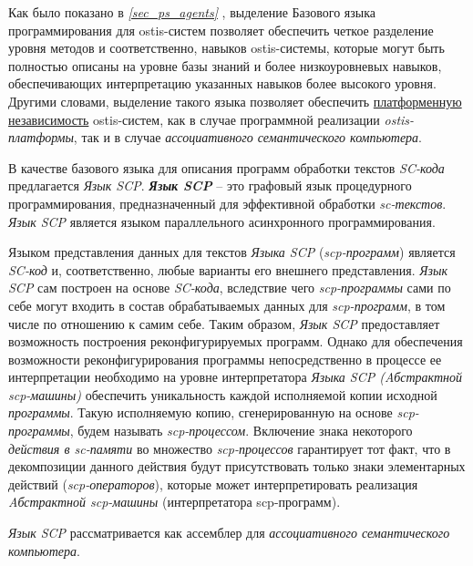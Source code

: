 Как было показано в \textit{\ref{sec_ps_agents} }, выделение Базового языка программирования для ostis-систем позволяет обеспечить четкое разделение уровня методов и соответственно, навыков ostis-системы, которые могут быть полностью описаны на уровне базы знаний и более низкоуровневых навыков, обеспечивающих интерпретацию указанных навыков более высокого уровня. Другими словами, выделение такого языка позволяет обеспечить \uline{платформенную независимость} ostis-систем, как в случае программной реализации \textit{ostis-платформы}, так и в случае \textit{ассоциативного семантического компьютера}.

В качестве базового языка для описания программ обработки текстов \textit{SC-кода} предлагается \textit{Язык SCP}. \textbf{\textit{Язык SCP}} -- это графовый язык процедурного программирования, предназначенный для эффективной обработки \textit{sc-текстов}. \textit{Язык SCP} является языком параллельного асинхронного программирования.

\begin{SCn}
\end{SCn}

Языком представления данных для текстов \textit{Языка SCP} (\textit{scp-программ}) является \textit{SC-код} и, соответственно, любые варианты его внешнего представления. \textit{Язык SCP} сам построен на основе \textit{SC-кода}, вследствие чего \textit{scp-программы} сами по себе могут входить в состав обрабатываемых данных для \textit{scp-программ}, в том числе по отношению к самим себе. Таким образом, \textit{Язык SCP} предоставляет возможность построения реконфигурируемых программ. Однако для обеспечения возможности реконфигурирования программы непосредственно в процессе ее интерпретации необходимо на уровне интерпретатора \textit{Языка SCP (Aбстрактной scp-машины)} обеспечить уникальность каждой исполняемой копии исходной \textit{программы}. Такую исполняемую копию, сгенерированную на основе \textit{scp-программы}, будем называть \textit{scp-процессом}.
Включение знака некоторого \textit{действия в sc-памяти} во множество \textit{scp-процессов} гарантирует тот факт, что в декомпозиции данного действия будут присутствовать только знаки элементарных действий (\textit{scp-операторов}), которые может интерпретировать реализация \textit{Aбстрактной scp-машины} (интерпретатора scp-программ).

\textit{Язык SCP} рассматривается как ассемблер для \textit{ассоциативного семантического компьютера}.

